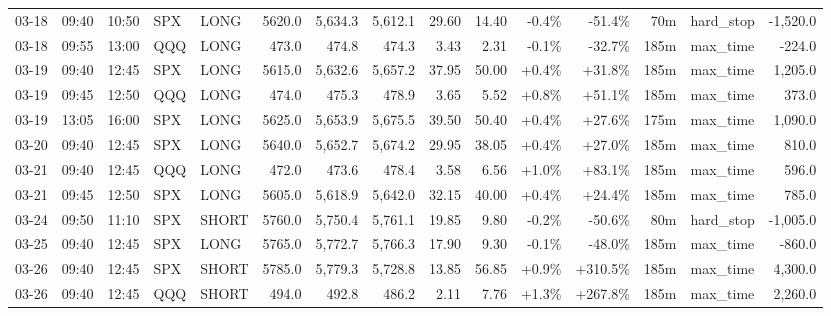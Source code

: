 \documentclass[11pt,a4paper,twoside]{article}
\begin{document}
\begin{landscape}
\begin{center}
\begin{longtable}{>{\color{txtmain}}l l l l l r r r r r r r r >{\color{txtmain}}l r}
03-18 & 09:40 & 10:50 & SPX & LONG & 5620.0 & 5,634.3 & 5,612.1 & 29.60 & 14.40 & \textcolor{lossred}{-0.4\%} & \textcolor{lossred}{-51.4\%} & 70m & hard\_stop & \textcolor{lossred}{-1,520.0} \\
03-18 & 09:55 & 13:00 & QQQ & LONG & 473.0 & 474.8 & 474.3 & 3.43 & 2.31 & \textcolor{lossred}{-0.1\%} & \textcolor{lossred}{-32.7\%} & 185m & max\_time & \textcolor{lossred}{-224.0} \\
03-19 & 09:40 & 12:45 & SPX & LONG & 5615.0 & 5,632.6 & 5,657.2 & 37.95 & 50.00 & \textcolor{wingreen}{+0.4\%} & \textcolor{wingreen}{+31.8\%} & 185m & max\_time & \textcolor{wingreen}{1,205.0} \\
03-19 & 09:45 & 12:50 & QQQ & LONG & 474.0 & 475.3 & 478.9 & 3.65 & 5.52 & \textcolor{wingreen}{+0.8\%} & \textcolor{wingreen}{+51.1\%} & 185m & max\_time & \textcolor{wingreen}{373.0} \\
03-19 & 13:05 & 16:00 & SPX & LONG & 5625.0 & 5,653.9 & 5,675.5 & 39.50 & 50.40 & \textcolor{wingreen}{+0.4\%} & \textcolor{wingreen}{+27.6\%} & 175m & max\_time & \textcolor{wingreen}{1,090.0} \\
03-20 & 09:40 & 12:45 & SPX & LONG & 5640.0 & 5,652.7 & 5,674.2 & 29.95 & 38.05 & \textcolor{wingreen}{+0.4\%} & \textcolor{wingreen}{+27.0\%} & 185m & max\_time & \textcolor{wingreen}{810.0} \\
03-21 & 09:40 & 12:45 & QQQ & LONG & 472.0 & 473.6 & 478.4 & 3.58 & 6.56 & \textcolor{wingreen}{+1.0\%} & \textcolor{wingreen}{+83.1\%} & 185m & max\_time & \textcolor{wingreen}{596.0} \\
03-21 & 09:45 & 12:50 & SPX & LONG & 5605.0 & 5,618.9 & 5,642.0 & 32.15 & 40.00 & \textcolor{wingreen}{+0.4\%} & \textcolor{wingreen}{+24.4\%} & 185m & max\_time & \textcolor{wingreen}{785.0} \\
03-24 & 09:50 & 11:10 & SPX & SHORT & 5760.0 & 5,750.4 & 5,761.1 & 19.85 & 9.80 & \textcolor{lossred}{-0.2\%} & \textcolor{lossred}{-50.6\%} & 80m & hard\_stop & \textcolor{lossred}{-1,005.0} \\
03-25 & 09:40 & 12:45 & SPX & LONG & 5765.0 & 5,772.7 & 5,766.3 & 17.90 & 9.30 & \textcolor{lossred}{-0.1\%} & \textcolor{lossred}{-48.0\%} & 185m & max\_time & \textcolor{lossred}{-860.0} \\
03-26 & 09:40 & 12:45 & SPX & SHORT & 5785.0 & 5,779.3 & 5,728.8 & 13.85 & 56.85 & \textcolor{wingreen}{+0.9\%} & \textcolor{wingreen}{+310.5\%} & 185m & max\_time & \textcolor{wingreen}{4,300.0} \\
03-26 & 09:40 & 12:45 & QQQ & SHORT & 494.0 & 492.8 & 486.2 & 2.11 & 7.76 & \textcolor{wingreen}{+1.3\%} & \textcolor{wingreen}{+267.8\%} & 185m & max\_time & \textcolor{wingreen}{2,260.0} \\

\end{longtable}
\end{center}
\end{landscape}
\end{document}
